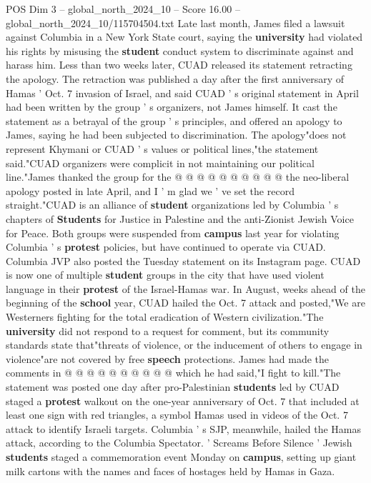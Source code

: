 \begin{textsample}{POS Dim 3 – global\_north\_2024\_10 – Score 16.00 – global\_north\_2024\_10/115704504.txt}
Late last month, James filed a lawsuit against Columbia in a New York State court, saying the \textbf{university} had violated his rights by misusing the \textbf{student} conduct system to discriminate against and harass him.
Less than two weeks later, CUAD released its statement retracting the apology.
The retraction was published a day after the first anniversary of Hamas ' Oct. 7 invasion of Israel, and said CUAD ' s original statement in April had been written by the group ' s organizers, not James himself.
It cast the statement as a betrayal of the group ' s principles, and offered an apology to James, saying he had been subjected to discrimination.
The apology"does not represent Khymani or CUAD ' s values or political lines,"the statement said."CUAD organizers were complicit in not maintaining our political line."James thanked the group for the @ @ @ @ @ @ @ @ @ @ the neo-liberal apology posted in late April, and I ' m glad we ' ve set the record straight."CUAD is an alliance of \textbf{student} organizations led by Columbia ' s chapters of \textbf{Students} for Justice in Palestine and the anti-Zionist Jewish Voice for Peace.
Both groups were suspended from \textbf{campus} last year for violating Columbia ' s \textbf{protest} policies, but have continued to operate via CUAD.
Columbia JVP also posted the Tuesday statement on its Instagram page.
CUAD is now one of multiple \textbf{student} groups in the city that have used violent language in their \textbf{protest} of the Israel-Hamas war.
In August, weeks ahead of the beginning of the \textbf{school} year, CUAD hailed the Oct. 7 attack and posted,"We are Westerners fighting for the total eradication of Western civilization."The \textbf{university} did not respond to a request for comment, but its community standards state that"threats of violence, or the inducement of others to engage in violence"are not covered by free \textbf{speech} protections.
James had made the comments in @ @ @ @ @ @ @ @ @ @ which he had said,"I fight to kill."The statement was posted one day after pro-Palestinian \textbf{students} led by CUAD staged a \textbf{protest} walkout on the one-year anniversary of Oct. 7 that included at least one sign with red triangles, a symbol Hamas used in videos of the Oct. 7 attack to identify Israeli targets.
Columbia ' s SJP, meanwhile, hailed the Hamas attack, according to the Columbia Spectator. ' Screams Before Silence ' Jewish \textbf{students} staged a commemoration event Monday on \textbf{campus}, setting up giant milk cartons with the names and faces of hostages held by Hamas in Gaza.

\end{textsample}
